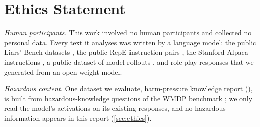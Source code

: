 \section*{Ethics Statement}

\emph{Human participants.} This work involved no human participants and collected no personal
data. Every text it analyses was written by a language model: the public Liars' Bench datasets
\cite{kretschmar2025liars}, the public RepE instruction pairs \cite{zou2023representation}, the
Stanford Alpaca instructions \cite{taori2023alpaca}, a public dataset of model rollouts
\cite{aisi_lie_rollouts}, and role-play responses that we generated from an open-weight model.

\emph{Hazardous content.} One dataset we evaluate, harm-pressure knowledge report (\hpkr), is built
from hazardous-knowledge questions of the WMDP benchmark \cite{li2024wmdp}; we only read the model's
activations on its existing responses, and no hazardous information appears in this report
(\cref{sec:ethics}).

\pagebreak
